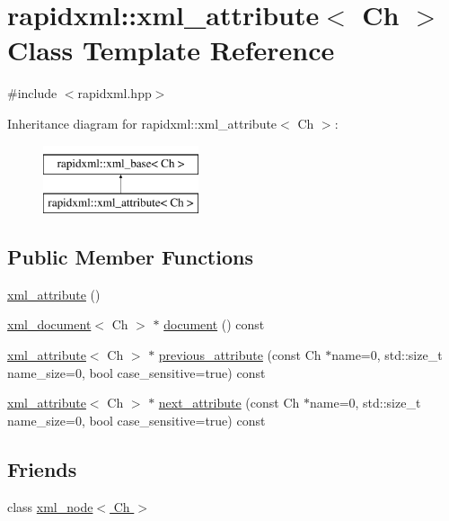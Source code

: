 \hypertarget{classrapidxml_1_1xml__attribute}{
\section{rapidxml::xml\_\-attribute$<$ Ch $>$ Class Template Reference}
\label{d9/db7/classrapidxml_1_1xml__attribute}
}


{\ttfamily \#include $<$rapidxml.hpp$>$}

Inheritance diagram for rapidxml::xml\_\-attribute$<$ Ch $>$:\begin{figure}[H]
\begin{center}
\leavevmode
\includegraphics[height=2.000000cm]{d9/db7/classrapidxml_1_1xml__attribute}
\end{center}
\end{figure}
\subsection*{Public Member Functions}
\begin{DoxyCompactItemize}
\item 
\hyperlink{classrapidxml_1_1xml__attribute_a26be291103917d3e8de110d46dd83816}{xml\_\-attribute} ()
\item 
\hyperlink{classrapidxml_1_1xml__document}{xml\_\-document}$<$ Ch $>$ $\ast$ \hyperlink{classrapidxml_1_1xml__attribute_a8b6d31d899e27f01bde35b53d98496ec}{document} () const 
\item 
\hyperlink{classrapidxml_1_1xml__attribute}{xml\_\-attribute}$<$ Ch $>$ $\ast$ \hyperlink{classrapidxml_1_1xml__attribute_ae3547cc30b201fd6d7b98c04dda26f89}{previous\_\-attribute} (const Ch $\ast$name=0, std::size\_\-t name\_\-size=0, bool case\_\-sensitive=true) const 
\item 
\hyperlink{classrapidxml_1_1xml__attribute}{xml\_\-attribute}$<$ Ch $>$ $\ast$ \hyperlink{classrapidxml_1_1xml__attribute_a56c08d7c96203286c889a43849328a86}{next\_\-attribute} (const Ch $\ast$name=0, std::size\_\-t name\_\-size=0, bool case\_\-sensitive=true) const 
\end{DoxyCompactItemize}
\subsection*{Friends}
\begin{DoxyCompactItemize}
\item 
class \hyperlink{classrapidxml_1_1xml__attribute_aa7e464ce3fe512598ff8dda47291941f}{xml\_\-node$<$ Ch $>$}
\end{DoxyCompactItemize}


